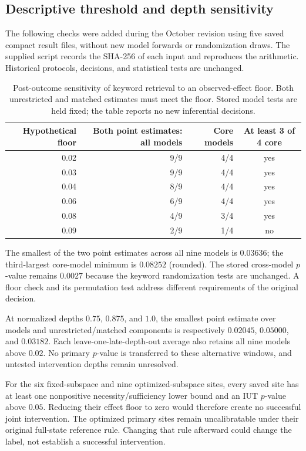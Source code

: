 \documentclass{article}
\begin{document}
\subsection{Descriptive threshold and depth sensitivity}
\label{app:sensitivity}

The following checks were added during the October revision using five saved
compact result files, without new model forwards or randomization draws.
The supplied script  records
the SHA-256 of each input and reproduces the arithmetic. Historical protocols,
decisions, and statistical tests are unchanged.

\begin{table}[ht]
\centering
\small
\begin{tabular}{rrrc}
\toprule
Hypothetical floor & Both point estimates: all models & Core models & At least 3 of 4 core \\
\midrule
0.02 & 9/9 & 4/4 & yes \\
0.03 & 9/9 & 4/4 & yes \\
0.04 & 8/9 & 4/4 & yes \\
0.06 & 6/9 & 4/4 & yes \\
0.08 & 4/9 & 3/4 & yes \\
0.09 & 2/9 & 1/4 & no \\
\bottomrule
\end{tabular}
\caption{Post-outcome sensitivity of keyword retrieval to an observed-effect
floor. Both unrestricted and matched estimates must meet the floor. Stored
model tests are held fixed; the table reports no new inferential decisions.}
\label{tab:sensitivity}
\end{table}

The smallest of the two point estimates across all nine models is
$0.03636$; the third-largest core-model minimum is $0.08252$ (rounded).
The stored cross-model $p$-value remains $0.0027$ because the keyword
randomization tests are unchanged. A floor check and its permutation test
address different requirements of the original decision.

At normalized depths $0.75$, $0.875$, and $1.0$, the smallest point estimate
over models and unrestricted/matched components is respectively $0.02045$,
$0.05000$, and $0.03182$. Each leave-one-late-depth-out average also retains
all nine models above $0.02$. No primary $p$-value is transferred to these
alternative windows, and untested intervention depths remain unresolved.

For the six fixed-subspace and nine optimized-subspace sites, every saved
site has at least one nonpositive necessity/sufficiency lower bound and an
IUT $p$-value above $0.05$. Reducing their effect floor to zero would therefore
create no successful joint intervention. The optimized primary sites remain
uncalibratable under their original full-state reference rule. Changing that
rule afterward could change the label, not establish a successful intervention.
\end{document}

